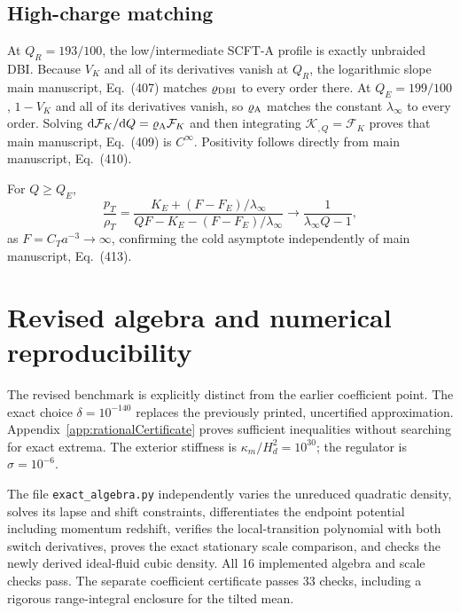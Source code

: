 \documentclass[aps,prd,reprint,onecolumn,notitlepage,nofootinbib,longbibliography,floatfix]{revtex4-2}
\theoremstyle{scstyle}
\theoremstyle{definition}
\theoremstyle{remark}
\newcommand{\dd}{\mathrm{d}}
\newcommand{\cK}{\mathcal K}
\newcommand{\JK}{\mathcal F_{K}}
\newcommand{\kap}{\kappa_m}
\begin{document}
\subsection{High-charge matching}

At $Q_R=193/100$, the low/intermediate SCFT-A profile is exactly unbraided DBI. Because $V_K$ and all of its derivatives vanish at $Q_R$, the logarithmic slope main manuscript, Eq.~(407) matches $\varrho_{\rm DBI}$ to every order there. At $Q_E=199/100$, $1-V_K$ and all of its derivatives vanish, so $\varrho_{\rm A}$ matches the constant $\lambda_\infty$ to every order. Solving $\dd\JK/\dd Q=\varrho_{\rm A}\JK$ and then integrating $\cK_{,Q}=\JK$ proves that main manuscript, Eq.~(409) is $C^\infty$. Positivity follows directly from main manuscript, Eq.~(410).

For $Q\ge Q_E$,
\begin{equation}
\frac{p_T}{\rho_T}
=\frac{K_E+(F-F_E)/\lambda_\infty}
{QF-K_E-(F-F_E)/\lambda_\infty}
\longrightarrow\frac{1}{\lambda_\infty Q-1},
\label{eq:appprimordialwtail}
\end{equation}
as $F=C_Ta^{-3}\to\infty$, confirming the cold asymptote independently of main manuscript, Eq.~(413).



\section{Revised algebra and numerical reproducibility}
\label{app:completedNumerics}\label{app:independentchecks}
The revised benchmark is explicitly distinct from the earlier coefficient point. The exact choice $\delta=10^{-140}$ replaces the previously printed, uncertified approximation. Appendix~\ref{app:rationalCertificate} proves sufficient inequalities without searching for exact extrema. The exterior stiffness is $\kap/H_d^2=10^{30}$; the regulator is $\sigma=10^{-6}$.

The file \texttt{exact\_algebra.py} independently varies the unreduced quadratic density, solves its lapse and shift constraints, differentiates the endpoint potential including momentum redshift, verifies the local-transition polynomial with both switch derivatives, proves the exact stationary scale comparison, and checks the newly derived ideal-fluid cubic density. All 16 implemented algebra and scale checks pass. The separate coefficient certificate passes 33 checks, including a rigorous range-integral enclosure for the tilted mean.
\end{document}
